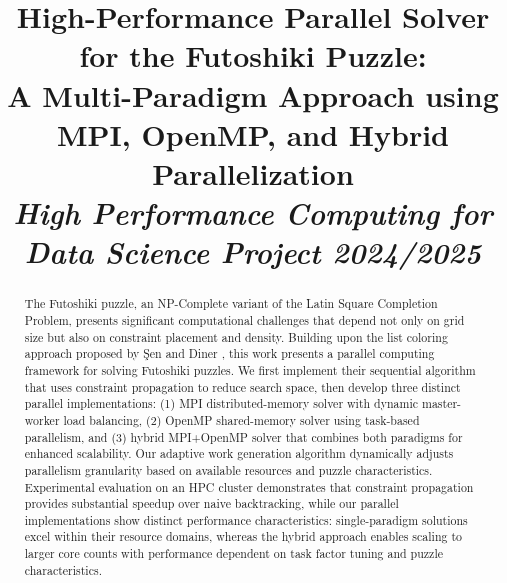 \documentclass[10pt, conference]{IEEEtran}
\begin{document}


\title{High-Performance Parallel Solver for the Futoshiki Puzzle:\\
A Multi-Paradigm Approach using MPI, OpenMP, and Hybrid Parallelization\\
\normalsize \textit{High Performance Computing for Data Science Project 2024/2025}
}

\author{
\and
{}
\and
{}
}

\maketitle

\begin{abstract}

The Futoshiki puzzle, an NP-Complete variant of the Latin Square Completion Problem, presents significant computational challenges that depend not only on grid size but also on constraint placement and density. Building upon the list coloring approach proposed by Şen and Diner \cite{Sen2024Futoshiki}, this work presents a parallel computing framework for solving Futoshiki puzzles. We first implement their sequential algorithm that uses constraint propagation to reduce search space, then develop three distinct parallel implementations: (1) MPI distributed-memory solver with dynamic master-worker load balancing, (2) OpenMP shared-memory solver using task-based parallelism, and (3) hybrid MPI+OpenMP solver that combines both paradigms for enhanced scalability. Our adaptive work generation algorithm dynamically adjusts parallelism granularity based on available resources and puzzle characteristics. Experimental evaluation on an HPC cluster demonstrates that constraint propagation provides substantial speedup over naive backtracking, while our parallel implementations show distinct performance characteristics: single-paradigm solutions excel within their resource domains, whereas the hybrid approach enables scaling to larger core counts with performance dependent on task factor tuning and puzzle characteristics.
\end{abstract}
\end{document}
